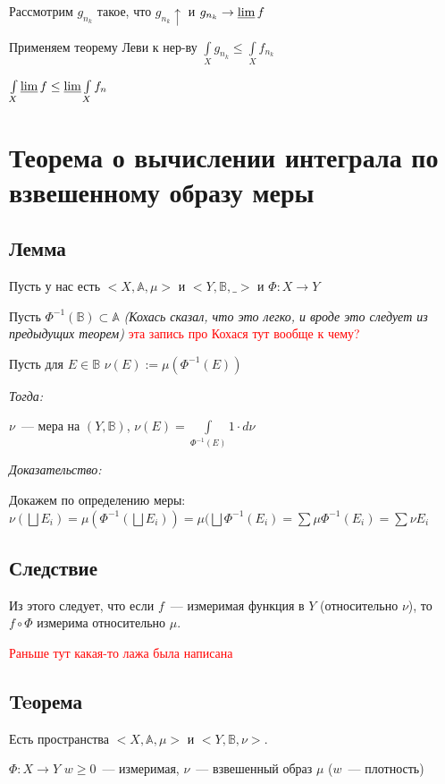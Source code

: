 \documentclass[paper=a4, fontsize=17pt]{article}
\begin{document}
Рассмотрим $ g_{n_k} $ такое, что $ g_{n_k} \uparrow $ и $ g_{n_k} \rightarrow \varliminf f $

Применяем теорему Леви к нер-ву $ \int\limits_{X} g_{n_k} \leq \int\limits_{X} f_{n_k}$

$ \int\limits_{X} \varliminf f \leq \varliminf \int\limits_{X} f_n $

\section{Теорема о вычислении интеграла по взвешенному образу меры}
	\subsection{Лемма}
		Пусть у нас есть $<X, \mathbb{A}, \mu>$ и $<Y, \mathbb{B}, \_>$ и $\Phi: X\rightarrow Y$

		Пусть  $\Phi^{-1}(\mathbb{B}) \subset \mathbb{A}$ \textit{(Кохась сказал, что это легко, и вроде это следует из предыдущих теорем)}
        \textcolor{red}{эта запись про Кохася тут вообще к чему?}

		Пусть для $E \in \mathbb{B}$ $\nu(E):=\mu(\Phi^{-1}(E))$

		\emph{Тогда:}

		 $\nu$~--- мера на $(Y, \mathbb{B})$, $\nu(E) = \int\limits_{\Phi^{-1}(E)} 1 \cdot d\nu$

		\emph{Доказательство:}

			Докажем по определению меры: \\

			$\nu(\bigsqcup E_i) = \mu(\Phi^{-1}(\bigsqcup E_i)) = \mu(\bigsqcup \Phi^{-1}(E_i) = \sum \mu \Phi^{-1}(E_i) = \sum \nu E_i$

	\subsection{Следствие}
	Из этого следует, что если $f$~--- измеримая функция в $Y$ (относительно $\nu$), то $f\circ \Phi$ измерима относительно $\mu$.

    \textcolor{red}{Раньше тут какая-то лажа была написана}

	\subsection {Teорема}
		Есть пространства $<X, \mathbb{A}, \mu>$ и $<Y, \mathbb{B}, \nu>$.

		$\Phi: X\rightarrow Y$
        $w \geq 0$~--- измеримая, $\nu$~--- взвешенный образ $\mu$ ($w$~--- плотность)
\end{document}
